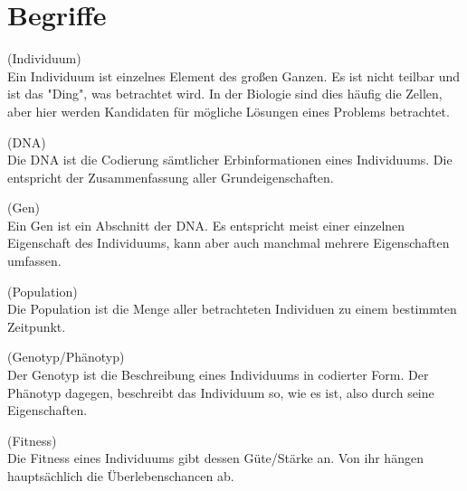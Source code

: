 \section{Begriffe}
\begin{mydef}(Individuum)\\
	Ein Individuum ist einzelnes Element des großen Ganzen. Es ist nicht teilbar und ist das "Ding", was betrachtet wird. In der Biologie sind dies häufig die Zellen, aber hier werden Kandidaten für mögliche Lösungen eines Problems betrachtet.
\end{mydef}
\begin{mydef}(DNA)\\
	Die DNA ist die  Codierung sämtlicher Erbinformationen eines Individuums. Die entspricht der Zusammenfassung aller Grundeigenschaften.
\end{mydef}
\begin{mydef}(Gen)\\
	Ein Gen ist ein Abschnitt der DNA. Es entspricht meist einer einzelnen Eigenschaft des Individuums, kann aber auch manchmal mehrere Eigenschaften umfassen.
\end{mydef}
\begin{mydef}(Population)\\
	Die Population ist die Menge aller betrachteten Individuen zu einem bestimmten Zeitpunkt.
\end{mydef}
\begin{mydef}(Genotyp/Phänotyp)\\
	Der Genotyp ist die Beschreibung eines Individuums in codierter Form. Der Phänotyp dagegen, beschreibt das Individuum so, wie es ist, also durch seine Eigenschaften.
\end{mydef}
\begin{mydef}(Fitness)\\
	Die Fitness eines Individuums gibt dessen Güte/Stärke an. Von ihr hängen hauptsächlich die Überlebenschancen ab.
\end{mydef}

